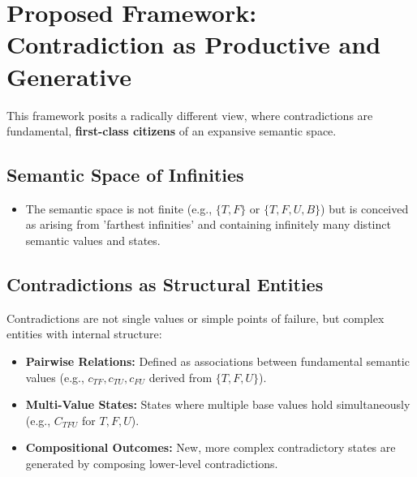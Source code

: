 	\section{Proposed Framework: Contradiction as Productive and Generative}
	
	This framework posits a radically different view, where contradictions are fundamental, \textbf{first-class citizens} of an expansive semantic space.
	
	\subsection{Semantic Space of Infinities}
	\begin{itemize}
		\item The semantic space is not finite (e.g., $\{T, F\}$ or $\{T, F, U, B\}$) but is conceived as arising from 'farthest infinities' and containing infinitely many distinct semantic values and states.
	\end{itemize}
	
	\subsection{Contradictions as Structural Entities}
	Contradictions are not single values or simple points of failure, but complex entities with internal structure:
	\begin{itemize}
		\item \textbf{Pairwise Relations:} Defined as associations between fundamental semantic values (e.g., $c_{TF}, c_{TU}, c_{FU}$ derived from $\{T, F, U\}$).
		\item \textbf{Multi-Value States:} States where multiple base values hold simultaneously (e.g., $C_{TFU}$ for $T, F, U$).
		\item \textbf{Compositional Outcomes:} New, more complex contradictory states are generated by composing lower-level contradictions.
	\end{itemize}
	
